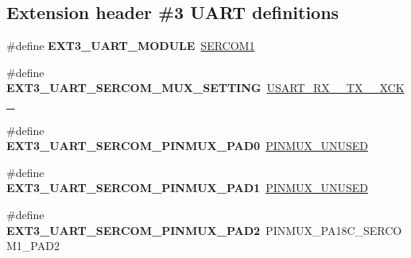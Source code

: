\subsection*{Extension header \#3 U\+A\+R\+T definitions}
\begin{DoxyCompactItemize}
\item 
\hypertarget{group__saml21__xplained__pro__features__group_ga4ba0c912918abec0687a93e135e0c1ba}{}\#define {\bfseries E\+X\+T3\+\_\+\+U\+A\+R\+T\+\_\+\+M\+O\+D\+U\+L\+E}~\hyperlink{group___s_a_m_l21_j18_a__base_ga130d7d7bc9ef1da1ba1bd094b42449d7}{S\+E\+R\+C\+O\+M1}\label{group__saml21__xplained__pro__features__group_ga4ba0c912918abec0687a93e135e0c1ba}

\item 
\hypertarget{group__saml21__xplained__pro__features__group_gab85f72ec57420f2ca281dc8ec8200888}{}\#define {\bfseries E\+X\+T3\+\_\+\+U\+A\+R\+T\+\_\+\+S\+E\+R\+C\+O\+M\+\_\+\+M\+U\+X\+\_\+\+S\+E\+T\+T\+I\+N\+G}~\hyperlink{group__asfdoc__sam0__sercom__usart__group_gga87bbdb9f7edb3f1866aeb498bf7c9077a026e9eb10b4f94b2a0e5640a9fe22544}{U\+S\+A\+R\+T\+\_\+\+R\+X\+\_\+\_\+\+T\+X\+\_\+\_\+\+X\+C\+K\+\_}\label{group__saml21__xplained__pro__features__group_gab85f72ec57420f2ca281dc8ec8200888}

\item 
\hypertarget{group__saml21__xplained__pro__features__group_gada3e8c4dfcbb8ea29ae7582dacb413bd}{}\#define {\bfseries E\+X\+T3\+\_\+\+U\+A\+R\+T\+\_\+\+S\+E\+R\+C\+O\+M\+\_\+\+P\+I\+N\+M\+U\+X\+\_\+\+P\+A\+D0}~\hyperlink{group__asfdoc__sam0__sercom__usart__group_gaffde9ff712058ef836127e1f3368889e}{P\+I\+N\+M\+U\+X\+\_\+\+U\+N\+U\+S\+E\+D}\label{group__saml21__xplained__pro__features__group_gada3e8c4dfcbb8ea29ae7582dacb413bd}

\item 
\hypertarget{group__saml21__xplained__pro__features__group_ga35fab6527496eabe2c5f7b6a4a80556a}{}\#define {\bfseries E\+X\+T3\+\_\+\+U\+A\+R\+T\+\_\+\+S\+E\+R\+C\+O\+M\+\_\+\+P\+I\+N\+M\+U\+X\+\_\+\+P\+A\+D1}~\hyperlink{group__asfdoc__sam0__sercom__usart__group_gaffde9ff712058ef836127e1f3368889e}{P\+I\+N\+M\+U\+X\+\_\+\+U\+N\+U\+S\+E\+D}\label{group__saml21__xplained__pro__features__group_ga35fab6527496eabe2c5f7b6a4a80556a}

\item 
\hypertarget{group__saml21__xplained__pro__features__group_ga3b425f4905c877a78674ca26aa08833b}{}\#define {\bfseries E\+X\+T3\+\_\+\+U\+A\+R\+T\+\_\+\+S\+E\+R\+C\+O\+M\+\_\+\+P\+I\+N\+M\+U\+X\+\_\+\+P\+A\+D2}~P\+I\+N\+M\+U\+X\+\_\+\+P\+A18\+C\+\_\+\+S\+E\+R\+C\+O\+M1\+\_\+\+P\+A\+D2\label{group__saml21__xplained__pro__features__group_ga3b425f4905c877a78674ca26aa08833b}


\end{DoxyCompactItemize}
